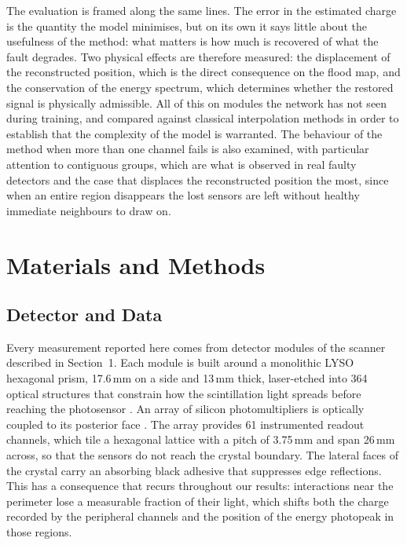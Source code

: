 \documentclass[10pt,conference]{IEEEtran}
\begin{document}
The evaluation is framed along the same lines. The error in the estimated
charge is the quantity the model minimises, but on its own it says little
about the usefulness of the method: what matters is how much is recovered of
what the fault degrades. Two physical effects are therefore measured: the
displacement of the reconstructed position, which is the direct consequence
on the flood map, and the conservation of the energy spectrum, which
determines whether the restored signal is physically admissible. All of this
on modules the network has not seen during training,
and compared against classical interpolation methods in order to establish
that the complexity of the model is warranted. The behaviour of the method
when more than one channel fails is also examined, with particular attention
to contiguous groups, which are what is observed in real faulty detectors
and the case that displaces the reconstructed position the most, since when an
entire region disappears the lost sensors are left without healthy immediate
neighbours to draw on.

\section{Materials and Methods}

\subsection{Detector and Data}
\label{sec:detector}

Every measurement reported here comes from detector modules of the scanner
described in Section~1. Each module is built around a monolithic LYSO hexagonal
prism, 17.6\,mm on a side and 13\,mm thick, laser-etched into 364 optical
structures that constrain how the scintillation light spreads before reaching
the photosensor \cite{perez-benito_laser-microstructured_2025}. An array of
silicon photomultipliers is optically coupled to its posterior face
\cite{perez-benito_sipm-based_2019}. The array provides 61 instrumented readout
channels, which tile a hexagonal lattice with a pitch of 3.75\,mm and span
26\,mm across, so that the sensors do not reach the crystal boundary. The lateral faces of the crystal carry an absorbing black adhesive
that suppresses edge reflections. This has a consequence that recurs
throughout our results: interactions near the perimeter lose a measurable
fraction of their light, which shifts both the charge recorded by the peripheral
channels and the position of the energy photopeak in those regions.
\end{document}

